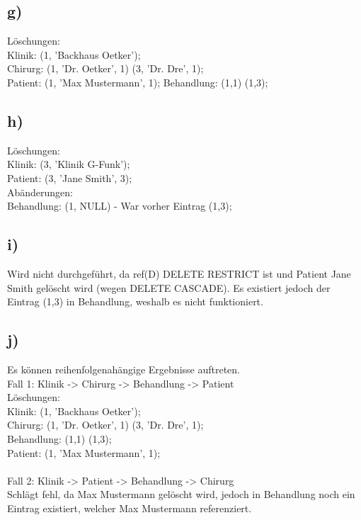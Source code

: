\subsection*{g)}
Löschungen:\\
Klinik: (1, 'Backhaus Oetker');\\
Chirurg: (1, 'Dr. Oetker', 1) (3, 'Dr. Dre', 1);\\
Patient: (1, 'Max Mustermann', 1);
Behandlung: (1,1) (1,3);
\subsection*{h)}
Löschungen:\\
Klinik: (3, 'Klinik G-Funk');\\
Patient: (3, 'Jane Smith', 3);\\
Abänderungen:\\
Behandlung: (1, NULL) - War vorher Eintrag (1,3);
\subsection*{i)}
Wird nicht durchgeführt, da ref(D) DELETE RESTRICT ist und Patient Jane Smith gelöscht wird (wegen DELETE CASCADE). Es existiert jedoch der Eintrag (1,3) in Behandlung, weshalb es nicht funktioniert.\\
\subsection*{j)}
Es können reihenfolgenahängige Ergebnisse auftreten.\\
Fall 1: Klinik -> Chirurg -> Behandlung -> Patient\\
Löschungen:\\
Klinik: (1, 'Backhaus Oetker');\\
Chirurg: (1, 'Dr. Oetker', 1) (3, 'Dr. Dre', 1);\\
Behandlung: (1,1) (1,3);\\
Patient: (1, 'Max Mustermann', 1);\\\\
Fall 2: Klinik -> Patient -> Behandlung -> Chirurg\\
Schlägt fehl, da Max Mustermann gelöscht wird, jedoch in Behandlung noch ein Eintrag existiert, welcher Max Mustermann referenziert.\\
